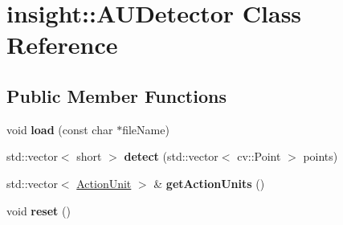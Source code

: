 \hypertarget{classinsight_1_1AUDetector}{}\section{insight\+:\+:A\+U\+Detector Class Reference}
\label{classinsight_1_1AUDetector}
\subsection*{Public Member Functions}
\begin{DoxyCompactItemize}
\item 
\hypertarget{classinsight_1_1AUDetector_a4341e50fb14e67fa16d63eab2dff13cd}{}void {\bfseries load} (const char $\ast$file\+Name)\label{classinsight_1_1AUDetector_a4341e50fb14e67fa16d63eab2dff13cd}

\item 
\hypertarget{classinsight_1_1AUDetector_a0bc9b12b8902709ddb2cf8dea6b938bc}{}std\+::vector$<$ short $>$ {\bfseries detect} (std\+::vector$<$ cv\+::\+Point $>$ points)\label{classinsight_1_1AUDetector_a0bc9b12b8902709ddb2cf8dea6b938bc}

\item 
\hypertarget{classinsight_1_1AUDetector_a071c354afa9e1d18fda6ae4289425397}{}std\+::vector$<$ \hyperlink{classinsight_1_1ActionUnit}{Action\+Unit} $>$ \& {\bfseries get\+Action\+Units} ()\label{classinsight_1_1AUDetector_a071c354afa9e1d18fda6ae4289425397}

\item 
\hypertarget{classinsight_1_1AUDetector_ad9aae7608349983c8af35b65253123ec}{}void {\bfseries reset} ()\label{classinsight_1_1AUDetector_ad9aae7608349983c8af35b65253123ec}

\end{DoxyCompactItemize}
